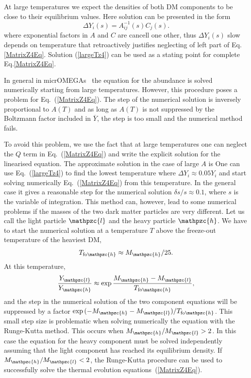 \documentclass[12pt,a4paper]{article}
\begin{document}
At large temperatures we expect the densities of  both DM components
to be close to their equilibrium values.  Here solution can be presented in
the form 
\begin{equation}
    \label{largeTz4}
    \Delta Y_i(s)=  A^{-1}_{ij}(s) C_j(s).
\end{equation}
where  exponential factors in $A$ and $C$ are cancell one other, thus
 $\Delta Y_i(s)$ slow depends on temperature that retroactively justifies
neglecting of left part of Eq.\ref{MatrixZ4Eq}. Solution (\ref{largeTz4})
can be used as a stating point for  complete Eq.\ref{MatrixZ4Eq}. 


 In general in micrOMEGAs~\cite{Belanger:2001fz} 
the equation for the abundance is solved numerically starting from large temperatures. 
However, this procedure poses a problem for Eq.~(\ref{MatrixZ4Eq}). 
The step of the numerical solution is inversely proportional to $A(T)$  and as long as  $A(T)$ 
is not suppressed by the  Boltzmann factor included in $\overline{Y}$,
   the step is too small and the numerical method fails. 

To avoid this problem,  we use the fact that at large temperatures 
one  can neglect the $Q$ term in Eq.~(\ref{MatrixZ4Eq}) and write the explicit solution for  the linearised equation.
The approximate solution in the case of large $A$ is 
One can use Eq.~(\ref{largeTz4}) to find the lowest temperature where $\Delta Y_i \approx 0.05 Y_i $ and start solving numerically  
Eq.~(\ref{MatrixZ4Eq}) from this temperature. In the general case  it gives a   reasonable step for the numerical solution $\delta s/s \approx 0.1$, where $s$ is the variable of integration.  
This method can, however, lead to some numerical problems if  the masses of the two dark matter particles are very different. Let us call the light particle $\mathpzc{l}$ and the heavy particle $\mathpzc{h}$.
We have to start the  numerical solution at a  temperature $T$ above the  freeze-out temperature  of the heaviest DM, 
\begin{equation} 
T_{{\rm fo}\mathpzc{h}} \approx M_{\mathpzc{h}}/25.
\end{equation}
 At this temperature,
\begin{equation} 
\frac{Y_{\mathpzc{l}}}{Y_{\mathpzc{h}}} \approx \exp{\frac{M_{\mathpzc{h}}-M_{\mathpzc{l}}}{T_{{\rm fo}\mathpzc{h}}}},
\end{equation}
and the step in the numerical   solution of the  two component equations will be
suppressed by a factor $\exp{(-M_{\mathpzc{h}}-M_{\mathpzc{l}}) / T_{{\rm fo}\mathpzc{h}}}$. This small step size is problematic when solving numerically the equation with the Runge-Kutta method. This occurs when $M_{\mathpzc{h}}/M_{\mathpzc{l}} >2$. In this case
the equation for the heavy component must be solved independently
assuming that the light component has reached its equilibrium density.  
If $M_{\mathpzc{h}}/M_{\mathpzc{l}} <2$, the
Runge-Kutta procedure can be used to successfully solve the  thermal evolution equations~(\ref{MatrixZ4Eq}).
\end{document}
